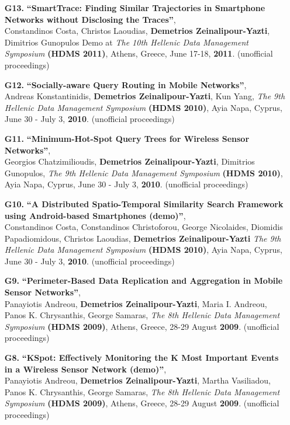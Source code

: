 \documentclass[10pt]{article}
\begin{document}
\begin{enumerate}
\item [{\bf G13.}]
\label{G13}
{\bf ``SmartTrace: Finding Similar Trajectories in Smartphone Networks without Disclosing the Traces''}, \\
Constandinos Costa, Christos Laoudias, {\bf Demetrios Zeinalipour-Yazti}, Dimitrios Gunopulos  
Demo at {\em The 10th Hellenic Data Management Symposium} {\bf (HDMS 2011)}, 
Athens, Greece, June 17-18, {\bf 2011}.  (unofficial proceedings)

\item [{\bf G12.}]
\label{G12}
{\bf ``Socially-aware Query Routing in Mobile Networks''}, \\
Andreas Konstantinidis, {\bf Demetrios Zeinalipour-Yazti}, Kun Yang,
{\em The 9th Hellenic Data Management Symposium} {\bf (HDMS 2010)}, 
Ayia Napa, Cyprus, June 30 - July 3, {\bf 2010}. (unofficial proceedings)

\item [{\bf G11.}]
\label{G11}
{\bf ``Minimum-Hot-Spot Query Trees for Wireless Sensor Networks''}, \\
Georgios Chatzimilioudis, {\bf Demetrios Zeinalipour-Yazti}, Dimitrios Gunopulos,
{\em The 9th Hellenic Data Management Symposium} {\bf (HDMS 2010)}, 
Ayia Napa, Cyprus, June 30 - July 3, {\bf 2010}.  (unofficial proceedings)

\item [{\bf G10.}]
\label{G10}
{\bf ``A Distributed Spatio-Temporal Similarity Search Framework using Android-based Smartphones (demo)''}, \\
Constandinos Costa, Constandinos Christoforou, George Nicolaides, Diomidis Papadiomidous, Christos Laoudias, {\bf Demetrios Zeinalipour-Yazti}
{\em The 9th Hellenic Data Management Symposium} {\bf (HDMS 2010)}, 
Ayia Napa, Cyprus, June 30 - July 3, {\bf 2010}. (unofficial proceedings)

\item [{\bf G9.}]
\label{G9}
{\bf ``Perimeter-Based Data Replication and Aggregation in Mobile Sensor Networks''}, \\
Panayiotis Andreou, {\bf Demetrios Zeinalipour-Yazti}, Maria I. Andreou, Panos K. Chrysanthis, George Samaras,  
{\em The 8th Hellenic Data Management Symposium} {\bf (HDMS 2009)}, 
Athens, Greece, 28-29 August {\bf 2009}.  (unofficial proceedings)

\item [{\bf G8.}]
\label{G8}
{\bf ``KSpot: Effectively Monitoring the K Most Important Events in a Wireless Sensor Network (demo)''}, \\
Panayiotis Andreou, {\bf Demetrios Zeinalipour-Yazti}, Martha Vasiliadou, Panos K. Chrysanthis, George Samaras,  
{\em The 8th Hellenic Data Management Symposium} {\bf (HDMS 2009)}, 
Athens, Greece, 28-29 August {\bf 2009}. (unofficial proceedings)


\end{enumerate}
\end{document}
